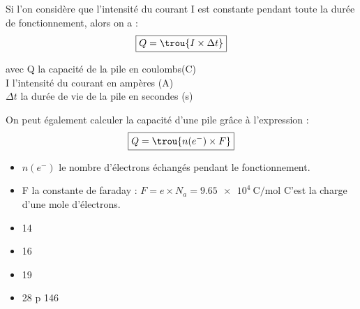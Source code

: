 Si l'on considère que l'intensité du courant I est constante pendant toute la durée de fonctionnement, alors on a :
$$\boxed{Q=\trou{I\times \Delta t}}$$
\begin{center}
 avec 
Q la capacité de la pile en coulombs(C)\\
I l'intensité du courant en ampères (A)\\
$\Delta t$ la durée de vie de la pile en secondes (s)
\end{center}
On peut également calculer la capacité d'une pile grâce à l'expression :$$\boxed{Q=\trou{n(e^-) \times F}}$$
\begin{itemize}
	\item $n(e^-)$ le nombre d'électrons échangés pendant le fonctionnement.
	\item F la constante de faraday : $F=e\times N_a=\SI{9,65e4}{\coulomb\per\mole}$ C'est la charge d'une mole d'électrons.

\end{itemize}
{}
\begin{itemize}
	\item 14 
	\item  16
	\item  19
	\item  28 p 146
\end{itemize}

